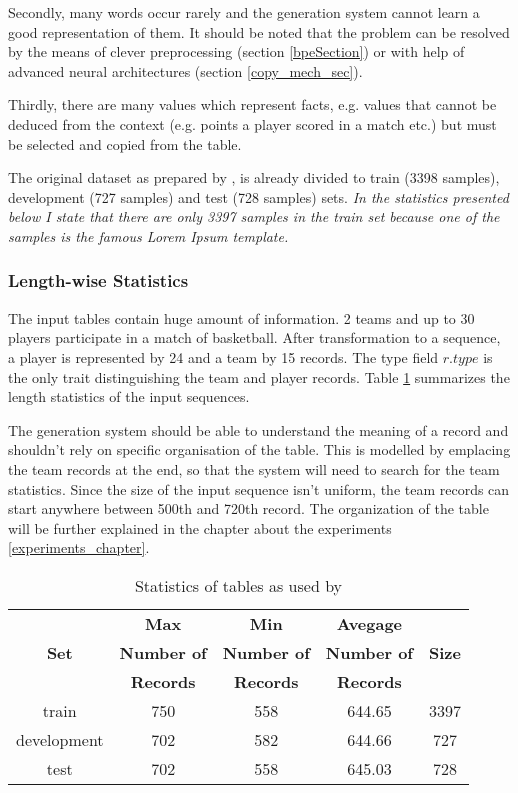 Secondly, many words occur rarely and the generation system cannot learn a good representation of them. It should be noted that the problem can be resolved by the means of clever preprocessing (section \ref{bpeSection}) or with help of advanced neural architectures (section \ref{copy_mech_sec}).

Thirdly, there are many values which represent facts, e.g. values that cannot be deduced from the context (e.g. points a player scored in a match etc.) but must be selected and copied from the table.

The original dataset as prepared by \citep{wiseman2017}, is already divided to train (3398 samples), development (727 samples) and test (728 samples) sets. \emph{In the statistics presented below I state that there are only 3397 samples in the train set because one of the samples is the famous Lorem Ipsum template.}

\subsubsection{Length-wise Statistics}

The input tables contain huge amount of information. 2 teams and up to 30 players participate in a match of basketball. After transformation to a sequence, a player is represented by 24 and a team by 15 records. The type field $r.type$ is the only trait distinguishing the team and player records. Table \ref{stats_tables_orig_rw} summarizes the length statistics of the input sequences. 

The generation system should be able to understand the meaning of a record and shouldn't rely on specific organisation of the table. This is modelled by emplacing the team records at the end, so that the system will need to search for the team statistics. Since the size of the input sequence isn't uniform, the team records can start anywhere between 500th and 720th record. The organization of the table will be further explained in the chapter about the experiments \ref{experiments_chapter}.

\begin{table}[h!]
    \centering
    \begin{tabular}{ccccc}
        \toprule
        {}    & \textbf{Max} & \textbf{Min} & \textbf{Avegage}& {} \\
        \textbf{Set} & \textbf{Number of} & \textbf{Number of} & \textbf{Number of} & \textbf{Size} \\
        {} & \textbf{Records} & \textbf{Records} & \textbf{Records} & {} \\
        \midrule
        train       & 750 & 558 & 644.65 & 3397  \\
        development & 702 & 582 & 644.66 & 727 \\
        test        & 702 & 558 & 645.03 & 728
    \end{tabular}
    \caption{Statistics of tables as used by \citep{wiseman2017}} \label{stats_tables_orig_rw}
\end{table}

